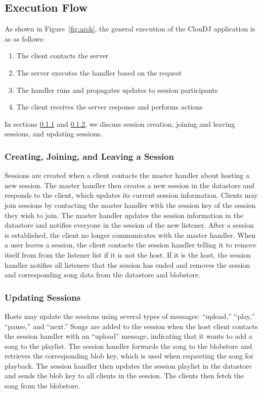 \subsection{Execution Flow}
\label{sec:execution}
As shown in Figure~\ref{fig:arch}, the general execution of the ClouDJ application
is as as follows:
\begin{enumerate}
  \item The client contacts the server
  \item The server executes the handler based on the request
  \item The handler runs and propagates updates to session participants
  \item The client receives the server response and performs actions 
\end{enumerate}

In sections \ref{sec:joinSession} and \ref{sec:playSession}, we discuss
session creation, joining and leaving sessions, and updating sessions.


\subsubsection{Creating, Joining, and Leaving a Session}
\label{sec:joinSession}
Sessions are created when a client contacts the master 
handler about hosting a new session. The master handler 
then creates a new session in the datastore and responds to the client, 
which updates its current session information. 
Clients may join sessions by contacting the master 
handler with the session key of the session they wish to join. 
The master handler updates the session information in the datastore
and notifies everyone in the session of the new listener. 
After a session is established, the client no longer communicates 
with the master handler. When a user leaves a session, the client
contacts the session handler telling it to remove itself from from
the listener list if it is not the host. If it is the host, the
session handler notifies all listeners that the session has ended and 
removes the session and corresponding song data from the datastore
and blobstore.

\subsubsection{Updating Sessions}
\label{sec:playSession}
Hosts may update the sessions using several types of messages: ``upload,''
``play,'' ``pause,'' and ``next.'' Songs are added to the session when 
the host client contacts the session handler with an ``upload'' message, 
indicating that it wants to add a song to the playlist. The session 
handler forwards the song to the blobstore and retrieves the corresponding 
blob key, which is used when requesting the song for playback. The session
handler then updates the session playlist in the datastore and sends the 
blob key to all clients in the session. The clients then fetch the song 
from the blobstore. 

